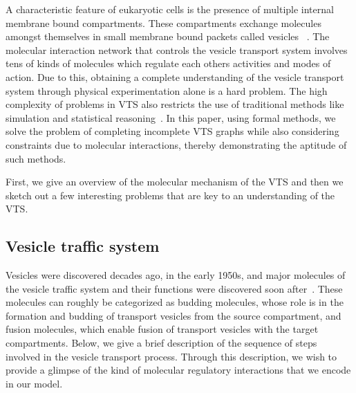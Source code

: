 A characteristic feature of eukaryotic cells is the presence of multiple internal membrane bound compartments. These compartments exchange molecules amongst themselves in small membrane bound packets called vesicles ~\cite{alberts2002molecular}.  The molecular interaction network that controls the vesicle transport system involves tens of kinds of molecules which regulate each others activities and modes of action. Due to this, obtaining a complete understanding of the vesicle transport system through physical experimentation alone is a hard problem.
%
The high complexity of problems in VTS also restricts the use of traditional methods like simulation and statistical reasoning~\cite{mani2016wine, mani2016stacking}. 
In this paper, using formal methods, we solve the problem of completing incomplete VTS graphs while also considering constraints due to molecular interactions, thereby demonstrating the aptitude of such methods.

First, we give an overview of the molecular mechanism of the VTS and then we sketch out a few interesting problems that are key to an understanding of the VTS.

\subsection{Vesicle traffic system}
Vesicles were discovered decades ago, in the early 1950s, and major molecules of the vesicle traffic system and their functions were discovered soon after~\cite{wells2005discovery}. These molecules can roughly be categorized as budding molecules, whose role is in the formation and budding of transport vesicles from the source compartment, and fusion molecules, which enable fusion of transport vesicles with the target compartments. Below, we give a brief description of the sequence of steps involved in the vesicle transport process. Through this description, we wish to provide a glimpse of the kind of molecular regulatory interactions that we encode in our model.


